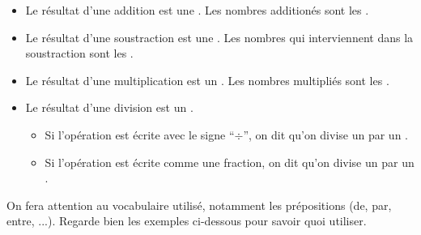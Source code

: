 \documentclass[../€Cours-complet/Cours-complet]{subfiles}
\begin{document}
\maketitle

\begin{cours}[Vocabulaire]
	\begin{itemize}
		\item Le résultat d'une addition est une . Les nombres additionés sont les .
		\item Le résultat d'une soustraction est une . Les nombres qui interviennent dans la soustraction sont les .
		\item Le résultat d'une multiplication est un . Les nombres multipliés sont les .
		\item Le résultat d'une division est un .
		      \begin{itemize}
			      \item Si l'opération est écrite avec le signe “$÷$”, on dit qu'on divise un  par un .
			      \item Si l'opération est écrite comme une fraction, on dit qu'on divise un  par un .
		      \end{itemize}
	\end{itemize} \vspace{1em}

	On fera attention au vocabulaire utilisé, notamment les prépositions (de, par, entre, ...). Regarde bien les exemples ci-dessous pour savoir quoi utiliser.
\end{cours}
\end{document}
